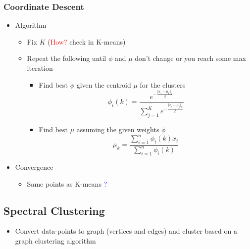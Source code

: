 \documentclass{article}
\newcommand{\red}[1]{\textcolor{red}{#1}}
\newcommand{\blue}[1]{\textcolor{blue}{#1}}
\begin{document}
\subsubsection{Coordinate Descent}
\begin{itemize}
    \item Algorithm
        \begin{itemize}
            \item Fix $K$ (\red{How?} check in K-means)
            \item Repeat the following until $\phi$ and $\mu$ don't change or you reach some max iteration
            \begin{itemize}
                \item Find best $\phi$ given the centroid $\mu$ for the clusters
                    $$\phi_i(k) = \frac{ e^{-\frac{\Vert x_i-\mu_k \Vert_2}{\beta} } } { \sum_{j=1}^K e^{-\frac{\Vert x_i-\mu_j \Vert_2}{\beta}} }$$
                \item Find best $\mu$ assuming the given weights $\phi$
                    $$\mu_k = \frac{\sum_{i=1}^n \phi_i(k) x_i}{\sum_{i=1}^n \phi_i(k)}$$
            \end{itemize}
        \end{itemize}
    \item Convergence
        \begin{itemize}
            \item Same points as K-means \blue{?}
        \end{itemize}
\end{itemize}


\subsection{Spectral Clustering}
\begin{itemize}
    \item Convert data-points to graph (vertices and edges) and cluster based on a graph clustering algorithm
\end{itemize}
\end{document}
